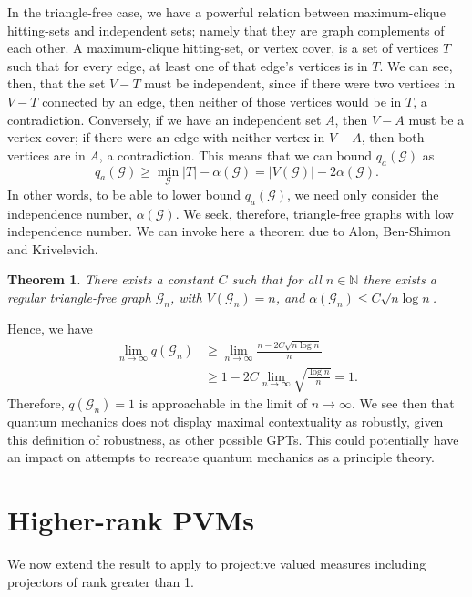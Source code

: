 \documentclass{amsart}
\newtheorem{thm}{Theorem}
\theoremstyle{definition}
\begin{document}
In the triangle-free case, we have a powerful relation between maximum-clique hitting-sets and independent sets; namely that they are graph complements of each other. A maximum-clique hitting-set, or vertex cover, is a set of vertices $T$ such that for every edge, at least one of that edge's vertices is in $T$. We can see, then, that the set $V-T$ must be independent, since if there were two vertices in $V-T$ connected by an edge, then neither of those vertices would be in $T$, a contradiction. Conversely, if we have an independent set $A$, then $V-A$ must be a vertex cover; if there were an edge with neither vertex in $V-A$, then both vertices are in $A$, a contradiction. This means that we can bound $q_a(\mathcal{G})$ as
\begin{equation}
q_a(\mathcal{G})\geq \min_\mathcal{G} |T| - \alpha(\mathcal{G}) = |V(\mathcal{G})|-2\alpha(\mathcal{G}).
\end{equation}
In other words, to be able to lower bound $q_a(\mathcal{G})$, we need only consider the independence number, $\alpha(\mathcal{G})$. We seek, therefore, triangle-free graphs with low independence number. We can invoke here a theorem due to Alon, Ben-Shimon and Krivelevich.\cite{Alon2010}
\begin{thm}
There exists a constant $C$ such that for all $n\in\mathbb{N}$ there exists a regular triangle-free graph $\mathcal{G}_n$, with $V(\mathcal{G}_n)=n$, and $\alpha(\mathcal{G}_n)\leq C\sqrt{n\log n}$.
\end{thm}

Hence, we have
\begin{align}
\lim_{n\rightarrow\infty}q(\mathcal{G}_n)&\geq\lim_{n\rightarrow\infty}\frac{n-2C\sqrt{n\log n}}{n}\\
&\geq 1-2C\lim_{n\rightarrow\infty}\sqrt{\frac{\log n}{n}}=1.
\end{align}
Therefore, $q(\mathcal{G}_n)=1$ is approachable in the limit of $n\rightarrow\infty$. We see then that quantum mechanics does not display maximal contextuality as robustly, given this definition of robustness, as other possible GPTs. This could potentially have an impact on attempts to recreate quantum mechanics as a principle theory.

\FloatBarrier

\section{Higher-rank PVMs}

We now extend the result to apply to projective valued measures including projectors of rank greater than 1.
\end{document}
